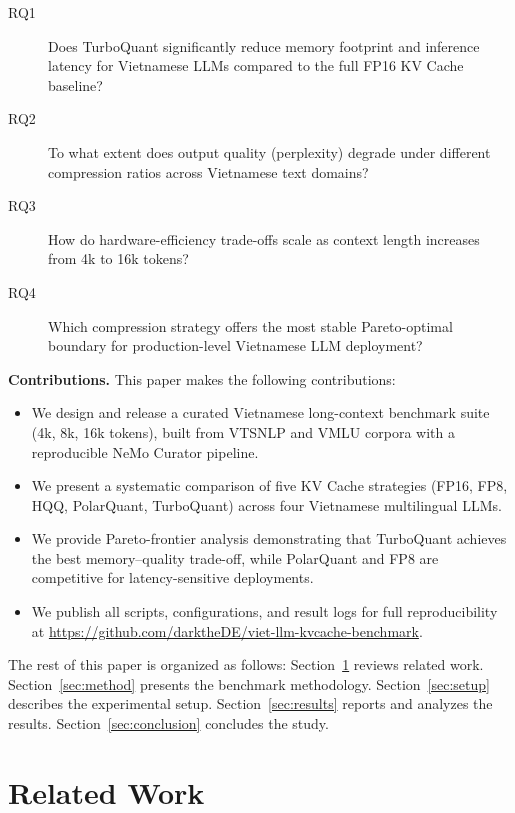 \documentclass[10pt,twocolumn]{article}
\begin{document}
\begin{description}
  \item[RQ1] Does TurboQuant significantly reduce memory footprint
    and inference latency for Vietnamese LLMs compared to the full
    FP16 KV Cache baseline?
  \item[RQ2] To what extent does output quality (perplexity)
    degrade under different compression ratios across Vietnamese
    text domains?
  \item[RQ3] How do hardware-efficiency trade-offs scale as
    context length increases from 4k to 16k tokens?
  \item[RQ4] Which compression strategy offers the most stable
    Pareto-optimal boundary for production-level Vietnamese LLM
    deployment?
\end{description}

\medskip
\noindent\textbf{Contributions.}
This paper makes the following contributions:

\begin{itemize}
  \item We design and release a curated Vietnamese long-context
    benchmark suite (4k, 8k, 16k tokens), built from VTSNLP and
    VMLU corpora with a reproducible NeMo Curator pipeline.
  \item We present a systematic comparison of five KV Cache strategies
    (FP16, FP8, HQQ, PolarQuant, TurboQuant) across four Vietnamese
    multilingual LLMs.
  \item We provide Pareto-frontier analysis demonstrating that
    TurboQuant achieves the best memory--quality trade-off,
    while PolarQuant and FP8 are competitive for latency-sensitive deployments.
  \item We publish all scripts, configurations, and result logs for
    full reproducibility at \url{https://github.com/darktheDE/viet-llm-kvcache-benchmark}.
\end{itemize}

The rest of this paper is organized as follows:
Section~\ref{sec:related} reviews related work.
Section~\ref{sec:method} presents the benchmark methodology.
Section~\ref{sec:setup} describes the experimental setup.
Section~\ref{sec:results} reports and analyzes the results.
Section~\ref{sec:conclusion} concludes the study.


\section{Related Work}
\label{sec:related}
\end{document}

